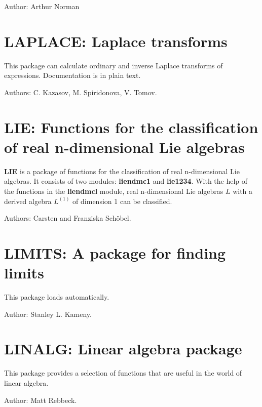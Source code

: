 Author: Arthur Norman



\newpage

\section{LAPLACE: Laplace transforms} 

This package can calculate ordinary and inverse Laplace transforms of
expressions.  Documentation is in plain text.

Authors: C. Kazasov, M. Spiridonova, V. Tomov.



\newpage

\section{LIE: Functions for the classification of real n-dimensional Lie
algebras}

{\bf LIE} is a package of functions for the classification of real
n-dimensional Lie algebras.  It consists of two modules: {\bf liendmc1}
and {\bf lie1234}.  With the help of the functions in the {\bf liendmcl}
module, real n-dimensional Lie algebras $L$ with a derived algebra
$L^{(1)}$ of dimension 1 can be classified.

Authors: Carsten and Franziska Sch\"obel.



\newpage

\section{LIMITS: A package for finding limits} 


This package loads automatically.

Author: Stanley L. Kameny.



\newpage

\section{LINALG: Linear algebra package} 
\label{LINALG}

This package provides a selection of functions that are useful 
in the world of linear algebra.

Author: Matt Rebbeck.


